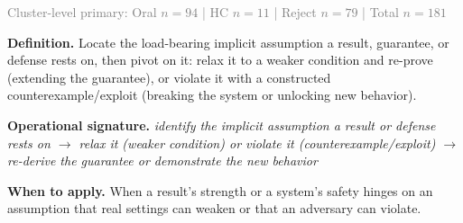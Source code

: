 
\begin{tcolorbox}[colback=bgskill, colframe=cblue!70, title={\textbf{Audit and Pivot an Assumption} \textcolor{gray}{\small\texttt{assumption\_audit\_and\_pivot}} \hfill \textit{Audit the load-bearing assumption and pivot}}, breakable, before skip=4pt, after skip=4pt]
\textcolor{gray}{\small Cluster-level primary: Oral $n=94$ | HC $n=11$ | Reject $n=79$ | Total $n=181$}

\textbf{Definition.} Locate the load-bearing implicit assumption a result, guarantee, or defense rests on, then pivot on it: relax it to a weaker condition and re-prove (extending the guarantee), or violate it with a constructed counterexample/exploit (breaking the system or unlocking new behavior).

\textbf{Operational signature.} \textit{identify the implicit assumption a result or defense rests on $\to$ relax it (weaker condition) or violate it (counterexample/exploit) $\to$ re-derive the guarantee or demonstrate the new behavior}

\textbf{When to apply.} When a result's strength or a system's safety hinges on an assumption that real settings can weaken or that an adversary can violate.


\end{tcolorbox}
